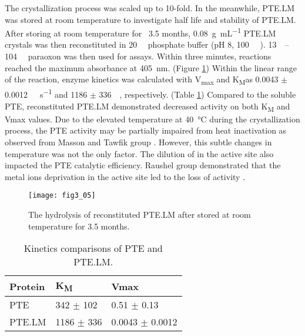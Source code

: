 \begin{refsection}
The crystallization process was scaled up to 10-fold. In the meanwhile, PTE.LM
was stored at room temperature to investigate half life and stability of
PTE.LM.  After storing at room temperature for ~3.5 months,
\SI{0.08}{\gram\per\mL} PTE.LM crystals was then reconstituted in
\SI{20}{\milli\Molar} phosphate buffer (pH 8, \SI{100}{\micro\Molar}
). \SIrange{13}{104}{\micro\Molar} paraoxon was then used for assays.
Within three minutes, reactions reached the maximum absorbance at
\SI{405}{\nm}. (Figure \ref{fig:ptelm-hydrolysis}) Within the linear range
of the reaction, enzyme kinetics was calculated with V\textsubscript{max} and
K\textsubscript{M}as 0.0043 $\pm$ \SI{0.0012}{\micro\Molar\per\second} and 1186
$\pm$ \SI{336}{\micro\Molar}, respectively. (Table \ref{tab:ptelm-table})
Compared to the soluble PTE, reconstituted PTE.LM demonstrated decreased
activity on both K\textsubscript{M} and Vmax values. Due to the elevated
temperature at \SI{40}{\celsius} during the crystallization process, the PTE
activity may be partially impaired from heat inactivation as observed from
Masson and Tawfik group \cite{Rochu2002b,Roodveldt2005}. However, this subtle
changes in temperature was not the only factor. The dilution of  in
the active site also impacted the PTE catalytic efficiency. Raushel group
demonstrated that the metal ions deprivation in the active site led to the loss
of activity \cite{Benning1995,Samples2005}. 
\begin{figure}[htbp] \centering \texttt{[image: fig3\_05]} 
    \caption[The hydrolysis of reconstituted PTE.LM after stored at room
    temperature for 3.5 months.]{The hydrolysis of reconstituted PTE.LM after
    stored at room temperature for 3.5 months.} \label{fig:ptelm-hydrolysis} 
\end{figure}

\begin{table}[h!]
    \centering
    \begin{tabular}{ lll }
        \hline
        Protein & K\textsubscript{M} & Vmax \\
        \hline
        PTE & 342 $\pm$ 102 & 0.51 $\pm$ 0.13 \\
        PTE.LM & 1186 $\pm$ 336 & 0.0043 $\pm$ 0.0012 \\
        \hline
    \end{tabular}
    \caption[Kinetics comparisons of PTE and PTE.LM.]{Kinetics comparisons of PTE and PTE.LM.} 
    \label{tab:ptelm-table} 
\end{table}


\end{refsection}
